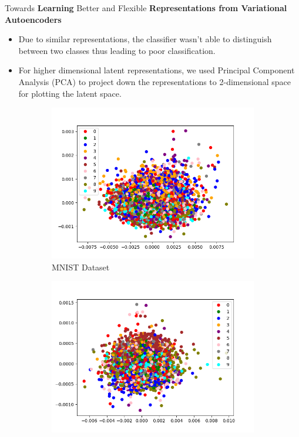 \documentclass[hyperref={colorlinks,citecolor=blue,linkcolor=blue,urlcolor=blue}]{beamer}
\begin{document}
\begin{frame}{ Towards \textbf{Learning} Better and Flexible \textbf{Representations from Variational Autoencoders} \vspace{0.3em}}
  \begin{itemize}
    \item Due to similar representations, the classifier wasn't able to distinguish between two classes thus leading to poor classification.
    \item For higher dimensional latent representations, we used Principal Component Analysis (PCA) to project down the representations to 2-dimensional space for plotting the latent space.
  \end{itemize}
  \begin{figure}
    \captionsetup{justification=centering}
    \begin{subfigure}[b]{0.4\textwidth}
        \centering
        \includegraphics[width=\textwidth,]{./Images/latent_MNIST_VAE_MAP.png}
        \caption{MNIST Dataset}
    \end{subfigure}
    \begin{subfigure}[b]{0.4\textwidth}
        \centering
        \includegraphics[width=\textwidth]{./Images/latent_FashionMNIST_VAE_MAP.png}

\end{subfigure}
\end{figure}
\end{frame}
\end{document}
